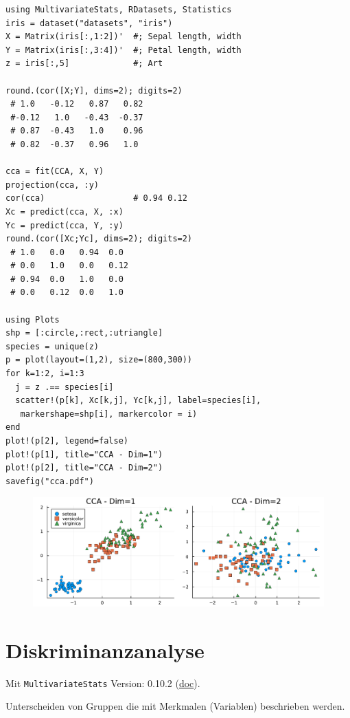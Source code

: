 \documentclass[10pt,twocolumn]{scrartcl}
\begin{document}
\begin{lstlisting}
using MultivariateStats, RDatasets, Statistics
iris = dataset("datasets", "iris")
X = Matrix(iris[:,1:2])'  #; Sepal length, width
Y = Matrix(iris[:,3:4])'  #; Petal length, width
z = iris[:,5]             #; Art

round.(cor([X;Y], dims=2); digits=2)
 # 1.0   -0.12   0.87   0.82
 #-0.12   1.0   -0.43  -0.37
 # 0.87  -0.43   1.0    0.96
 # 0.82  -0.37   0.96   1.0

cca = fit(CCA, X, Y)
projection(cca, :y)
cor(cca)                  # 0.94 0.12
Xc = predict(cca, X, :x)
Yc = predict(cca, Y, :y)
round.(cor([Xc;Yc], dims=2); digits=2)
 # 1.0   0.0   0.94  0.0
 # 0.0   1.0   0.0   0.12
 # 0.94  0.0   1.0   0.0
 # 0.0   0.12  0.0   1.0

using Plots
shp = [:circle,:rect,:utriangle]
species = unique(z)
p = plot(layout=(1,2), size=(800,300))
for k=1:2, i=1:3
  j = z .== species[i]
  scatter!(p[k], Xc[k,j], Yc[k,j], label=species[i],
   markershape=shp[i], markercolor = i)
end
plot!(p[2], legend=false)
plot!(p[1], title="CCA - Dim=1")
plot!(p[2], title="CCA - Dim=2")
savefig("cca.pdf")
\end{lstlisting}

\begin{figure}[ht]
  \centering
  \includegraphics[width=.95\columnwidth]{cca.pdf}
\end{figure}

\section{Diskriminanzanalyse}

Mit \lstinline|MultivariateStats| Version: 0.10.2
(\href{https://juliastats.org/MultivariateStats.jl/stable/lda/}{doc}).

Unterscheiden von Gruppen die mit Merkmalen (Variablen) beschrieben werden.
\end{document}
